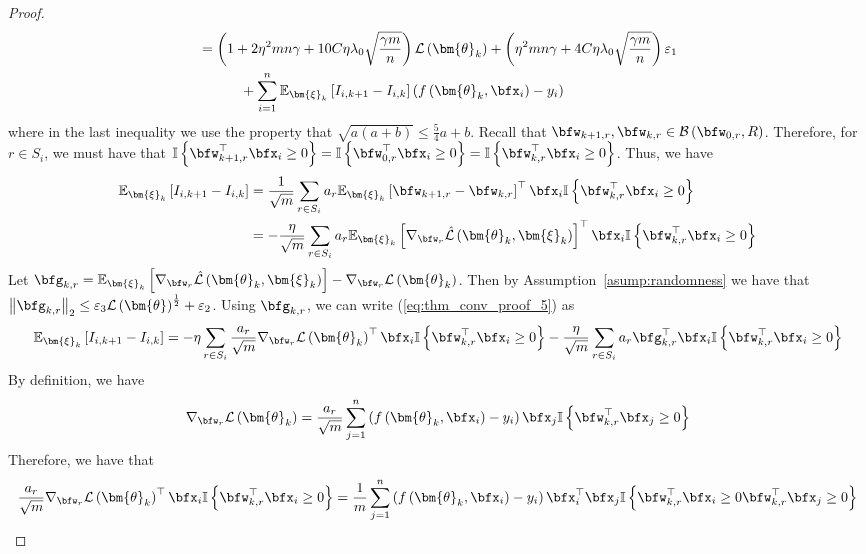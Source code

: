 \documentclass[10pt]{article} %
\theoremstyle{definition}
\theoremstyle{plain}
\newcommand{\paren}[1]{\left(#1\right)}
\newcommand{\norm}[1]{\left\|#1\right\|}
\newcommand{\indy}[1]{\mathbb{I}\left\{#1\right\}}
\providecommand{\E}{\mathbb{E}}
\def\calL{{\mathcal{L}}}
\begin{document}
\begin{proof}
\begin{equation}
\begin{aligned}
            & = \paren{1 + 2\eta^2mn\gamma + 10C\eta\lambda_0\sqrt{\frac{\gamma m}{n}}}\calL\paren{\bm{\theta}_k} + \paren{\eta^2mn\gamma + 4C\eta\lambda_0\sqrt{\frac{\gamma m}{n}}}\varepsilon_1\\
             &\quad\quad\quad + \sum_{i=1}^n\E_{\bm{\xi}_k}\left[I_{i,k+1}-I_{i,k}\right]\paren{f\paren{\bm{\theta}_k,\bfx_i} - y_i}
        \end{aligned}
    \end{equation}
    where in the last inequality we use the property that $\sqrt{a(a+b)}\leq \frac{5}{4}a + b$.
    Recall that $\bfw_{k+1,r},\bfw_{k,r}\in\mathcal{B}\paren{\bfw_{0,r}, R}$. Therefore, for $r\in S_i$, we must have that $\indy{\bfw_{k+1,r}^\top\bfx_i\geq 0} = \indy{\bfw_{0,r}^\top\bfx_i\geq 0} = \indy{\bfw_{k,r}^\top\bfx_i\geq 0}$. Thus, we have
    \begin{equation}
        \label{eq:thm_conv_proof_5}
        \begin{aligned}
            \E_{\bm{\xi}_k}\left[I_{i,k+1} - I_{i,k}\right] & = \frac{1}{\sqrt{m}}\sum_{r\in S_i}a_r\E_{\bm{\xi}_k}\left[\bfw_{k+1,r}-\bfw_{k,r}\right]^\top\bfx_i\indy{\bfw_{k,r}^\top\bfx_i\geq 0}\\
            & = -\frac{\eta}{\sqrt{m}}\sum_{r\in S_i}a_r\E_{\bm{\xi}_k}\left[\nabla_{\bfw_r}\hat{\calL}\paren{\bm{\theta}_k,\bm{\xi}_k}\right]^\top\bfx_i\indy{\bfw_{k,r}^\top\bfx_i\geq 0}
        \end{aligned}
    \end{equation}
    Let $\bfg_{k,r} = \E_{\bm{\xi}_k}\left[\nabla_{\bfw_r}\hat{\calL}\paren{\bm{\theta}_k,\bm{\xi}_k}\right] - \nabla_{\bfw_r}\calL\paren{\bm{\theta}_k}$. Then by Assumption~\ref{asump:randomness} we have that $\norm{\bfg_{k,r}}_2\leq \varepsilon_3\calL\paren{\bm{\theta}}^{\frac{1}{2}} + \varepsilon_2$. Using $\bfg_{k,r}$, we can write (\ref{eq:thm_conv_proof_5}) as
    \begin{equation}
        \label{eq:thm_conv_proof_6}
        \E_{\bm{\xi}_k}\left[I_{i,k+1} - I_{i,k}\right] =  -\eta\sum_{r\in S_i}\frac{a_r}{\sqrt{m}}\nabla_{\bfw_r}\calL\paren{\bm{\theta}_k}^\top\bfx_i\indy{\bfw_{k,r}^\top\bfx_i\geq 0}  -\frac{\eta}{\sqrt{m}}\sum_{r\in S_i}a_r\bfg_{k,r}^\top\bfx_i\indy{\bfw_{k,r}^\top\bfx_i\geq 0}
    \end{equation}
    By definition, we have
    \[
        \nabla_{\bfw_r}\calL\paren{\bm{\theta}_k} = \frac{a_r}{\sqrt{m}}\sum_{j=1}^n\paren{f\paren{\bm{\theta}_k,\bfx_i}-y_i}\bfx_j\indy{\bfw_{k,r}^\top\bfx_j\geq 0}
    \]
    Therefore, we have that
    \[
        \frac{a_r}{\sqrt{m}}\nabla_{\bfw_r}\calL\paren{\bm{\theta}_k}^\top\bfx_i\indy{\bfw_{k,r}^\top\bfx_i\geq 0} = \frac{1}{m}\sum_{j=1}^n\paren{f\paren{\bm{\theta}_k,\bfx_i}-y_i}\bfx_i^\top\bfx_j\indy{\bfw_{k,r}^\top\bfx_i\geq 0\bfw_{k,r}^\top\bfx_j\geq 0}
\]
\end{proof}
\end{document}

